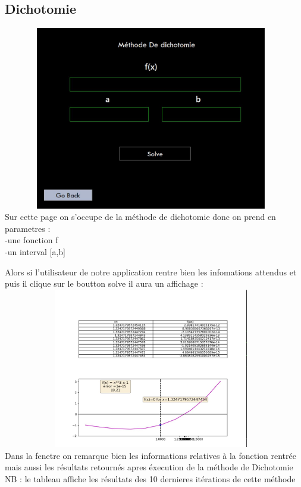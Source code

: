 \documentclass{article}
\begin{document}
\subsection{Dichotomie}
\includegraphics[width=13cm,height=8cm]{img/dicho.JPG}\\

Sur cette page on s'occupe de la méthode de dichotomie donc on prend en parametres :\\
-une fonction f\\
-un interval [a,b]

Alors si l'utilisateur de notre application rentre bien les infomations attendus et puis il clique sur le boutton solve il aura un affichage :\\
\includegraphics[width=13cm,height=7cm]{img/dicho_graph.JPG}\\

Dans la fenetre on remarque bien les informations relatives à la fonction rentrée mais aussi les résultats retournés apres éxecution de la méthode de Dichotomie \\
NB : le tableau affiche les résultats des 10 dernieres itérations de cette méthode  
\end{document}
